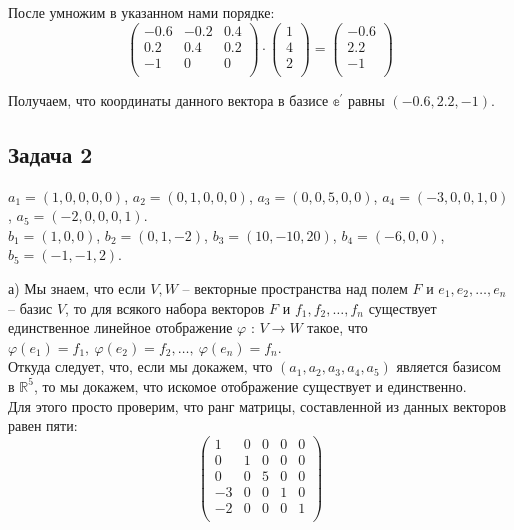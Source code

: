 	После умножим в указанном нами порядке:
	\[
	\begin{pmatrix}
	-0.6 & -0.2 & 0.4 \\
	0.2 & 0.4 & 0.2 \\
	-1 & 0 & 0 \\
	\end{pmatrix} \cdot 
	\begin{pmatrix}
	1 \\
	4 \\
	2 \\
	\end{pmatrix} = 
	\begin{pmatrix}
	-0.6 \\
	2.2 \\
	-1 \\
	\end{pmatrix}
	\]

	Получаем, что координаты данного вектора в базисе $\mathbb{e}^\prime$ равны $(-0.6, 2.2, -1)$.
	
	\subsection{Задача 2} 
	$a_1 = (1, 0, 0, 0, 0)$, $a_2 = (0, 1, 0, 0, 0)$, $a_3 = (0, 0, 5, 0, 0)$, $a_4 = (-3, 0, 0, 1, 0)$, $a_5 = (-2, 0, 0, 0, 1)$. \\
	
	$b_1 = (1, 0, 0)$, $b_2 = (0, 1, -2)$, $b_3 = (10, -10, 20)$, $b_4 = (-6, 0, 0)$, $b_5 = (-1, -1, 2)$.
	
	а)
	Мы знаем, что если $V, W$ -- векторные пространства над полем $F$ и $e_1, e_2, \ldots, e_n$ -- базис $V$, то для всякого набора векторов $F$ и $f_1, f_2, \ldots, f_n$ существует единственное линейное отображение $\varphi$ : $V \rightarrow W$ такое, что $\varphi(e_1) = f_1,\ \varphi(e_2) = f_2, \ldots,\ \varphi(e_n) = f_n$. \\
	Откуда следует, что, если мы докажем, что $(a_1, a_2, a_3, a_4, a_5)$ является базисом в $\mathbb{R}^5$, то мы докажем, что искомое отображение существует и единственно. \\
	Для этого просто проверим, что ранг матрицы, составленной из данных векторов равен пяти: 
	\[
	\begin{pmatrix}
	1 & 0 & 0 & 0 & 0 \\
	0 & 1 & 0 & 0 & 0 \\
	0 & 0 & 5 & 0 & 0 \\
	-3 & 0 & 0 & 1 & 0 \\
	-2 & 0 & 0 & 0 & 1 \\
	\end{pmatrix}
	\]
	

